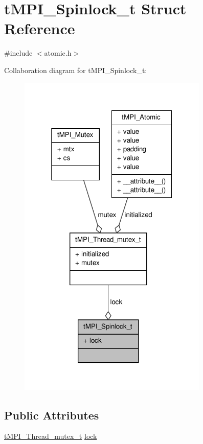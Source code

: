 \hypertarget{structtMPI__Spinlock__t}{\section{t\-M\-P\-I\-\_\-\-Spinlock\-\_\-t \-Struct \-Reference}
\label{structtMPI__Spinlock__t}
}


{\ttfamily \#include $<$atomic.\-h$>$}



\-Collaboration diagram for t\-M\-P\-I\-\_\-\-Spinlock\-\_\-t\-:
\nopagebreak
\begin{figure}[H]
\begin{center}
\leavevmode
\includegraphics[width=256pt]{structtMPI__Spinlock__t__coll__graph}
\end{center}
\end{figure}
\subsection*{\-Public \-Attributes}
\begin{DoxyCompactItemize}
\item 
\hyperlink{structtMPI__Thread__mutex__t}{t\-M\-P\-I\-\_\-\-Thread\-\_\-mutex\-\_\-t} \hyperlink{structtMPI__Spinlock__t_aab4bfe38103faeceb8aecb300d53629e}{lock}
\end{DoxyCompactItemize}


